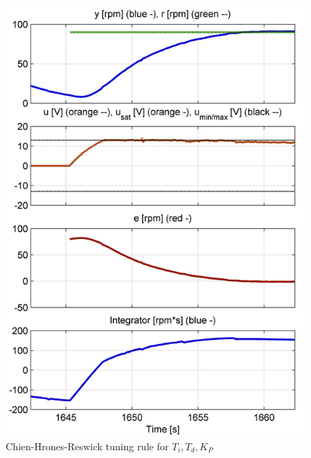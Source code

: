 \begin{figure}[H]
\begin{center}
\includegraphics[width=0.5\linewidth]{images/general/PID/Chien_Hrones_Reswick}
\end{center}
\caption{Chien-Hrones-Reswick tuning rule for $T_{i}, T_{d},K_{P}$}
\label{fig:Chien_Hrones_Reswick}
\end{figure}